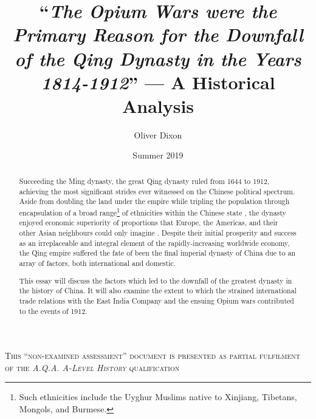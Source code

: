 \documentclass{article}
\title{``\emph{The Opium Wars were the Primary Reason for the Downfall of the Qing Dynasty in the Years 1814-1912}'' --- A Historical Analysis}
\author{Oliver Dixon}
\date{Summer 2019}
\newcommand{\textrule}{\noindent\makebox[\linewidth]{\rule{\linewidth}{0.4pt}}}
\begin{document}
\maketitle

\begin{abstract}

	Succeeding the Ming dynasty, the great Qing dynasty ruled from 1644 to 1912, achieving the most significant strides ever witnessed on the Chinese political spectrum. Aside from doubling the land under the empire \autocite{Turchin:2006} while tripling the population through encapsulation of a broad range\footnote{Such ethnicities include the Uyghur Muslims native to Xinjiang, Tibetans, Mongols, and Burmese.} of ethnicities within the Chinese state \autocite{Rowe:2012}, the dynasty enjoyed economic superiority of proportions that Europe, the Americas, and their other Asian neighbours could only imagine \autocite{Maddison:2007}. Despite their initial prosperity and success as an irreplaceable and integral element of the rapidly-increasing worldwide economy, the Qing empire suffered the fate of been the final imperial dynasty of China due to an array of factors, both international and domestic.

	This essay will discuss the factors which led to the downfall of the greatest dynasty in the history of China. It will also examine the extent to which the strained international trade relations with the East India Company and the ensuing Opium wars contributed to the events of 1912.

\end{abstract}

\textrule
\vspace*{0.6em}
\centering
\textsc{This ``non-examined assessment'' document is presented as partial fulfilment of the \textit{A.Q.A. A-Level History} qualification} \\
\textrule

\begin{multicols}{2}


\end{multicols}

\printbibliography
\end{document}

